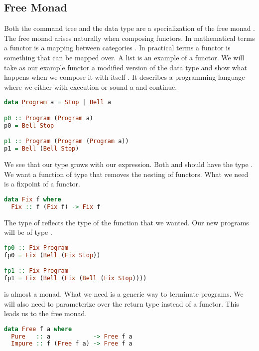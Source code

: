 \subsection{\label{subsection:freemonad}Free Monad}
Both the command tree and the  data type are a specialization of the free monad \autocite{swierstra2008data}. The free monad arises naturally when composing functors. In mathematical terms a functor is a mapping between categories \autocite{barr1990category}. In practical terms a functor is something that can be mapped over. A list is an example of a functor. We will take as our example functor a modified version of the  data type and show what happens when we compose it with itself \autocite{freemonadsforall}. It describes a programming language where we either  with execution or sound a  and continue.

\begin{lstlisting}[language=Haskell]
data Program a = Stop | Bell a

p0 :: Program (Program a)
p0 = Bell Stop

p1 :: Program (Program (Program a))
p1 = Bell (Bell Stop)
\end{lstlisting}

We see that our type grows with our expression. Both  and  should have the type . We want a function of type  that removes the nesting of functors. What we need is a fixpoint of a functor.

\begin{lstlisting}[language=Haskell]
data Fix f where
  Fix :: f (Fix f) -> Fix f
\end{lstlisting}

The type of  reflects the type of the function that we wanted. Our new programs will be of type .

\begin{lstlisting}[language=Haskell]
fp0 :: Fix Program
fp0 = Fix (Bell (Fix Stop))

fp1 :: Fix Program
fp1 = Fix (Bell (Fix (Bell (Fix Stop))))
\end{lstlisting}

 is almost a monad. What we need is a generic way to terminate programs. We will also need to parameterize over the return type instead of a functor. This leads us to the free monad.

\begin{lstlisting}[language=Haskell]
data Free f a where
  Pure   :: a            -> Free f a
  Impure :: f (Free f a) -> Free f a
\end{lstlisting}

